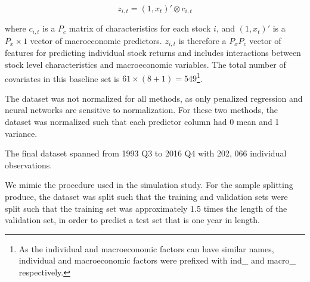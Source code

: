 \documentclass[11pt, a4paper, table]{article}
\begin{document}
\begin{equation}
z_{i,t} = (1, x_t)' \otimes c_{i, t}
\end{equation}

where $c_{i,t}$ is a $P_c$ matrix of characteristics for each stock $i$, and $(1, x_t)'$ is a $P_x \times 1$ vector of macroeconomic predictors. $z_{i,t}$ is therefore a $P_x P_c$ vector of features for predicting individual stock returns and includes interactions between stock level characteristics and macroeconomic variables. The total number of covariates in this baseline set is $61 \times (8 + 1) = 549$\footnote{As the individual and macroeconomic factors can have similar names, individual and macroeconomic factors were prefixed with ind\_ and macro\_ respectively.}.
 

The dataset was not normalized for all methods, as only penalized regression and neural networks are sensitive to normalization. For these two methods, the dataset was normalized such that each predictor column had 0 mean and 1 variance.

The final dataset spanned from 1993 Q3 to 2016 Q4 with 202, 066 individual observations.

We mimic the procedure used in the simulation study. For the sample splitting produce, the dataset was split such that the training and validation sets were split such that the training set was approximately 1.5 times the length of the validation set, in order to predict a test set that is one year in length.
\end{document}

